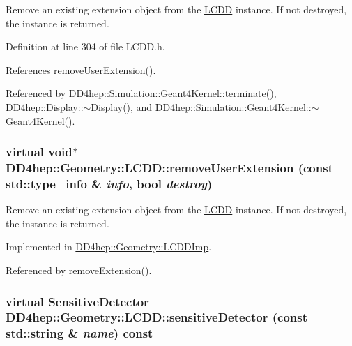 Remove an existing extension object from the \hyperlink{class_d_d4hep_1_1_geometry_1_1_l_c_d_d}{LCDD} instance. If not destroyed, the instance is returned. 

Definition at line 304 of file LCDD.h.

References removeUserExtension().

Referenced by DD4hep::Simulation::Geant4Kernel::terminate(), DD4hep::Display::$\sim$Display(), and DD4hep::Simulation::Geant4Kernel::$\sim$Geant4Kernel().\hypertarget{class_d_d4hep_1_1_geometry_1_1_l_c_d_d_a05c121b360d248ce34a2d9337df9f49b}{
\subsubsection[{removeUserExtension}]{\setlength{\rightskip}{0pt plus 5cm}virtual void$\ast$ DD4hep::Geometry::LCDD::removeUserExtension (const std::type\_\-info \& {\em info}, \/  bool {\em destroy})}}
\label{class_d_d4hep_1_1_geometry_1_1_l_c_d_d_a05c121b360d248ce34a2d9337df9f49b}


Remove an existing extension object from the \hyperlink{class_d_d4hep_1_1_geometry_1_1_l_c_d_d}{LCDD} instance. If not destroyed, the instance is returned. 

Implemented in \hyperlink{class_d_d4hep_1_1_geometry_1_1_l_c_d_d_imp_a9e43af7ad956710acab4aead5a41dc13}{DD4hep::Geometry::LCDDImp}.

Referenced by removeExtension().\hypertarget{class_d_d4hep_1_1_geometry_1_1_l_c_d_d_af476b8241b93e82350ec1e5cbf145941}{
\subsubsection[{sensitiveDetector}]{\setlength{\rightskip}{0pt plus 5cm}virtual {\bf SensitiveDetector} DD4hep::Geometry::LCDD::sensitiveDetector (const std::string \& {\em name}) const}}
\label{class_d_d4hep_1_1_geometry_1_1_l_c_d_d_af476b8241b93e82350ec1e5cbf145941}


